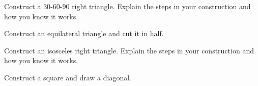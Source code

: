\documentclass[nooutcomes]{ximera}
\begin{document}


\begin{problem}
Construct a $30$-$60$-$90$ right triangle. Explain the steps in your
  construction and how you know it works.
\begin{freeResponse}
\begin{hint}
Construct an equilateral triangle and cut it in half.  
\end{hint}
\end{freeResponse}
\end{problem}

\begin{problem}
Construct an isosceles right triangle. Explain the steps in your
  construction and how you know it works.
\begin{freeResponse}
\begin{hint}
Construct a square and draw a diagonal.  
\end{hint}
\end{freeResponse}
\end{problem}
\end{document}
